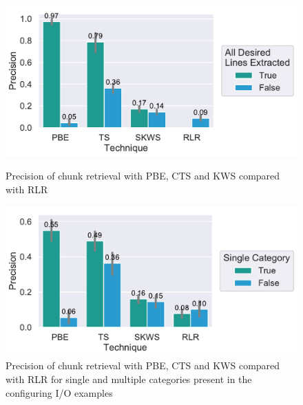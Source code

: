 \documentclass[\myrootdir/main.tex]{subfiles}
\begin{document}
\begin{figure}[htbp]
	\centering
	\begin{minipage}{0.45\textwidth}
		\centering
		\includegraphics[width=\textwidth, clip]{img/big-study/precision-all.pdf}
		\caption{Precision  of chunk retrieval with PBE, CTS and KWS compared with RLR}
		\label{fig:precision-all}
	\end{minipage}\hfill
	\begin{minipage}{0.45\textwidth}
		\centering
		\includegraphics[width=\textwidth, clip]{img/big-study/precision-category-singularity-all.pdf}
		\caption{Precision  of chunk retrieval with PBE, CTS and KWS compared with RLR for single and multiple categories present in the configuring I/O examples}
		\label{fig:precision-category-singularity-all}
	\end{minipage}
\end{figure}
\end{document}
